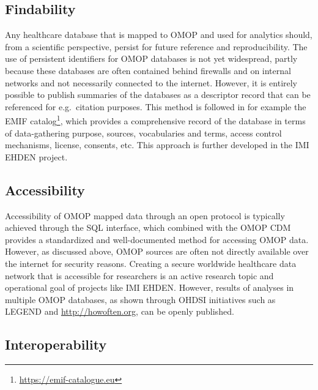 \documentclass[11pt]{book}
\let\rmarkdownfootnote\footnote%
\def\footnote{\protect\rmarkdownfootnote}
\theoremstyle{definition}
\theoremstyle{definition}
\theoremstyle{definition}
\theoremstyle{remark}
\begin{document}
\subsection{Findability}\label{findability}

Any healthcare database that is mapped to OMOP and used for analytics
should, from a scientific perspective, persist for future reference and
reproducibility. The use of persistent identifiers for OMOP databases is
not yet widespread, partly because these databases are often contained
behind firewalls and on internal networks and not necessarily connected
to the internet. However, it is entirely possible to publish summaries
of the databases as a descriptor record that can be referenced for
e.g.~citation purposes. This method is followed in for example the EMIF
catalog\footnote{\url{https://emif-catalogue.eu}}, which provides a
comprehensive record of the database in terms of data-gathering purpose,
sources, vocabularies and terms, access control mechanisms, license,
consents, etc. \citep{Oliveira2019} This approach is further developed
in the IMI EHDEN project.

\subsection{Accessibility}\label{accessibility}

Accessibility of OMOP mapped data through an open protocol is typically
achieved through the SQL interface, which combined with the OMOP CDM
provides a standardized and well-documented method for accessing OMOP
data. However, as discussed above, OMOP sources are often not directly
available over the internet for security reasons. Creating a secure
worldwide healthcare data network that is accessible for researchers is
an active research topic and operational goal of projects like IMI
EHDEN. However, results of analyses in multiple OMOP databases, as shown
through OHDSI initiatives such as LEGEND and \url{http://howoften.org},
can be openly published.

\subsection{Interoperability}\label{interoperability}
\end{document}
